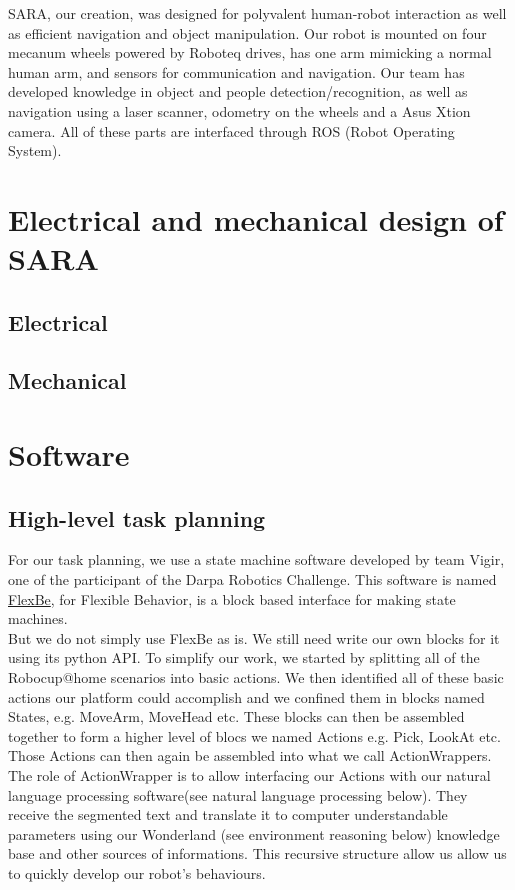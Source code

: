 \documentclass[runningheads,a4paper]{llncs}
\begin{document}
SARA, our creation, was designed for polyvalent human-robot interaction as well as efficient navigation and object manipulation. Our robot is mounted on four mecanum wheels powered by Roboteq drives, has one arm mimicking a normal human arm, and sensors for communication and navigation. Our team has developed knowledge in object and people detection/recognition, as well as navigation using a laser scanner, odometry on the wheels and a Asus Xtion camera. All of these parts are interfaced through ROS (Robot Operating System). \\

\section{Electrical and mechanical design of SARA}
\subsection{Electrical}


\subsection{Mechanical}


\section{Software}

\subsection{High-level task planning}
\tab For our task planning, we use a state machine software developed by team Vigir, one of the participant of the Darpa Robotics Challenge. This software is named \href{http://philserver.bplaced.net/fbe/index.php}{FlexBe}, for Flexible Behavior, is a block based interface for making state machines.\\

But we do not simply use FlexBe as is. We still need write our own blocks for it using its python API. To simplify our work, we started by splitting all of the Robocup@home scenarios into basic actions. We then identified all of these basic actions our platform could accomplish and we confined them in blocks named States, e.g. MoveArm, MoveHead etc. These blocks can then be assembled together to form a higher level of blocs we named Actions e.g. Pick, LookAt etc. Those Actions can then again be assembled into what we call ActionWrappers. The role of ActionWrapper is to allow interfacing our Actions with our natural language processing software(see natural language processing below). They receive the segmented text and translate it to computer understandable parameters using our Wonderland (see environment reasoning below) knowledge base and other sources of informations. This recursive structure allow us allow us to quickly develop our robot’s behaviours.
\end{document}
